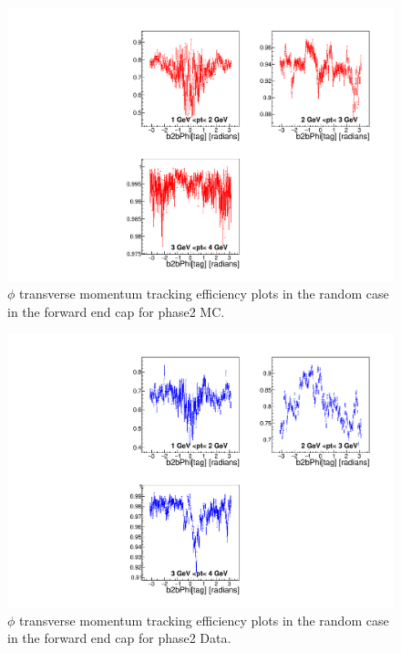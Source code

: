 \documentclass[a4paper,11pt,twosided,final,german,openbib,pdftex,listof=totoc,bibliography=totoc]{scrbook}
\begin{document}
\begin{appendix}
\begin{figure}[!htbp]
	\centering
	\includegraphics[width=\textwidth]{Plots/master/xPtMPhiRandomFC_MC}
	\caption[Transverse Momentum $\phi$ Random Forward End Cap Efficiency Phase2 MC]{$\phi$ transverse momentum tracking efficiency plots in the random case in the forward end cap for phase2 MC.}
	\label{plt:PtMPhiRandomFC_MC}
\end{figure}


\begin{figure}[!htbp]
	\centering
	\includegraphics[width=\textwidth]{Plots/master/xPtMPhiRandomFC_Data}
	\caption[Transverse Momentum $\phi$ Random Forward End Cap Efficiency Phase2 Data]{$\phi$ transverse momentum tracking efficiency plots in the random case in the forward end cap for phase2 Data.}
	\label{plt:PtMPhiRandomFC_Data}
\end{figure}



\end{appendix}
\end{document}
